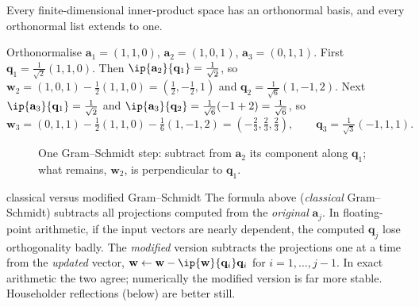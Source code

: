 \begin{corollary}\label{cor:onbexists}
Every finite-dimensional inner-product space has an orthonormal basis, and every orthonormal list extends to one.
\end{corollary}

\begin{example}\label{ex:gs}
Orthonormalise $\mathbf{a}_1=(1,1,0)$, $\mathbf{a}_2=(1,0,1)$, $\mathbf{a}_3=(0,1,1)$. First $\mathbf{q}_1=\frac1{\sqrt2}(1,1,0)$. Then $\ip{\mathbf{a}_2}{\mathbf{q}_1}=\frac1{\sqrt2}$, so $\mathbf{w}_2=(1,0,1)-\frac12(1,1,0)=(\tfrac12,-\tfrac12,1)$ and $\mathbf{q}_2=\frac1{\sqrt6}(1,-1,2)$. Next $\ip{\mathbf{a}_3}{\mathbf{q}_1}=\frac1{\sqrt2}$ and $\ip{\mathbf{a}_3}{\mathbf{q}_2}=\frac{1}{\sqrt6}(-1+2)=\frac1{\sqrt6}$, so
\[ \mathbf{w}_3=(0,1,1)-\tfrac12(1,1,0)-\tfrac16(1,-1,2)=(-\tfrac23,\tfrac23,\tfrac23),\qquad\mathbf{q}_3=\tfrac1{\sqrt3}(-1,1,1). \]
\end{example}

\begin{figure}[h]
\centering
{}
\caption{One Gram--Schmidt step: subtract from $\mathbf{a}_2$ its component along $\mathbf{q}_1$; what remains, $\mathbf{w}_2$, is perpendicular to $\mathbf{q}_1$.}
\end{figure}

\begin{nuance}{classical versus modified Gram--Schmidt}
The formula above (\emph{classical} Gram--Schmidt) subtracts all projections computed from the \emph{original} $\mathbf{a}_j$. In floating-point arithmetic, if the input vectors are nearly dependent, the computed $\mathbf{q}_j$ lose orthogonality badly. The \emph{modified} version subtracts the projections one at a time from the \emph{updated} vector, $\mathbf{w}\leftarrow\mathbf{w}-\ip{\mathbf{w}}{\mathbf{q}_i}\mathbf{q}_i$ for $i=1,\dots,j-1$. In exact arithmetic the two agree; numerically the modified version is far more stable. Householder reflections (below) are better still.
\end{nuance}

